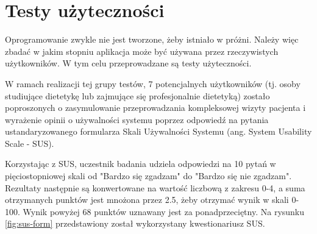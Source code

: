 
\section{Testy użyteczności}

Oprogramowanie zwykle nie jest tworzone, żeby istniało w próżni.
Należy więc zbadać w jakim stopniu aplikacja może być używana przez rzeczywistych użytkowników.
W tym celu przeprowadzane są testy użyteczności\cite{book:testowanie-i-jakosc-oprogramowania}.

\par
W ramach realizacji tej grupy testów, 7 potencjalnych użytkowników (tj. osoby studiujące dietetykę lub zajmujące się profesjonalnie dietetyką)
zostało poproszonych o zasymulowanie przeprowadzania kompleksowej wizyty pacjenta
i wyrażenie opinii o używalności systemu poprzez odpowiedź na pytania ustandaryzowanego formularza Skali Używalności Systemu (ang. System Usability Scale - SUS)\cite{url:sus}.

\par
Korzystając z SUS, uczestnik badania udziela odpowiedzi na 10 pytań w pięciostopniowej skali od "Bardzo się zgadzam" do "Bardzo się nie zgadzam".
Rezultaty następnie są konwertowane na wartość liczbową z zakresu 0-4, a suma otrzymanych punktów jest mnożona przez 2.5, żeby otrzymać wynik w skali 0-100.
Wynik powyżej 68 punktów uznawany jest za ponadprzeciętny.
Na rysunku \ref{fig:sus-form} przedstawiony został wykorzystany kwestionariusz SUS.



\thispagestyle{normal}
